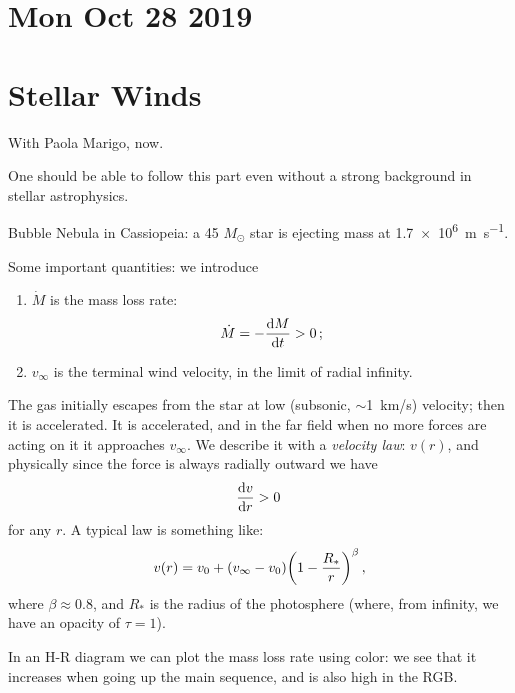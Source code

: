 \documentclass[main.tex]{subfiles}
\begin{document}
\section*{Mon Oct 28 2019}

\section{Stellar Winds}

With Paola Marigo, now.

One should be able to follow this part even without a strong background in stellar astrophysics.

Bubble Nebula in Cassiopeia: a 45 \(M_{\odot}\) star is ejecting mass at \SI{1.7e6}{m\per\second}.

Some important quantities: we introduce 

\begin{enumerate}
    \item \(\dot{M}\) is the mass loss rate: 
    \begin{equation}
      \dot{M} = - \dv{M}{t} >0
    \,;
    \end{equation}
    \item \(v_{\infty}\) is the terminal wind velocity, in the limit of radial infinity.
\end{enumerate}

The gas initially escapes from the star at low (subsonic, \(\sim\)\SI{1}{km/s}) velocity; then it is accelerated.
It is accelerated, and in the far field when no more forces are acting on it it approaches \(v_{\infty}\).
We describe it with a \emph{velocity law}: \(v(r)\), and physically since the force is always radially outward we have 
%
\begin{equation}
  \dv{v}{r} > 0
\,
\end{equation}
%
for any \(r\). A typical law is something like: 
%
\begin{equation}
  v(r) = v_0 + \qty(v_{\infty}-v_{0} ) \qty(1 - \frac{R_{*}}{r})^{\beta }
\,,
\end{equation}
%
where \(\beta \approx 0.8\), and \(R_{*}\) is the radius of the photosphere (where, from infinity, we have an opacity of \(\tau = 1\)).

In an H-R diagram we can plot the mass loss rate using color: we see that it increases when going up the main sequence, and is also high in the RGB.
\end{document}
